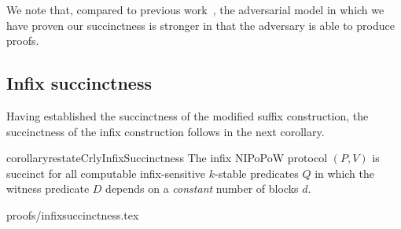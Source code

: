 We note that, compared to previous work~\cite{KLS}, the adversarial model in
which we have proven our succinctness is stronger in that the adversary is able
to produce proofs.

\subsection{Infix succinctness}
Having established the succinctness of the modified suffix construction, the
succinctness of the infix construction follows in the next corollary.

\begin{restatable}{corollary}{restateCrlyInfixSuccinctness}
\label{thm.infix-succinctness}
The infix NIPoPoW protocol $(P, V)$ is succinct for all computable
infix-sensitive $k$-stable predicates $Q$ in which the witness predicate $D$
depends on a \emph{constant} number of blocks $d$.
\end{restatable}
{proofs/infixsuccinctness.tex}
